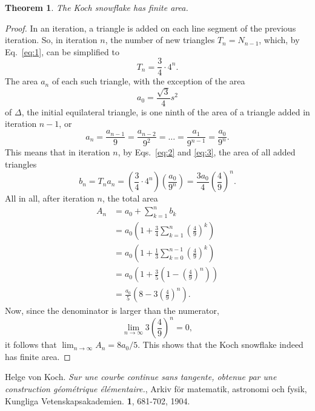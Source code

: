 \documentclass[12pt,a4paper]{article}
\newtheorem{theorem}{Theorem}
\begin{document}
\begin{theorem}
	The Koch snowflake has finite area.
\end{theorem}
\begin{proof}  
  In an iteration, a triangle is added on each line segment of the previous iteration. So, in iteration $n$, the number of new triangles $T_n = N_{n-1}$, which, by Eq.~\ref{eq:1}, can be simplified to 
	\begin{equation}
		\label{eq:2}
		T_n = \frac{3}{4} \cdot 4^n.
	\end{equation}
	The area $a_n$ of each such triangle, with the exception of the area
	\begin{displaymath}
		a_0 = \frac{\sqrt{3}}{4}s^2
	\end{displaymath}
	of $\Delta$, the initial equilateral triangle, is one ninth of the area of a triangle added in iteration $n - 1$, or 
	\begin{equation}
    	\label{eq:3}
    	a_n = \frac{a_{n-1}}{9} = \frac{a_{n-2}}{9^2} =  \ldots = \frac{a_1}{9^{n-1}} = \frac{a_0}{9^n}.
    \end{equation}
    This means that in iteration $n$, by Eqs.~\ref{eq:2} and \ref{eq:3}, the area of all added triangles
    \begin{displaymath}
    	b_n = T_na_n = \left(\frac{3}{4} \cdot 4^n \right) \left(\frac{a_0}{9^n}\right)  = \frac{3a_0}{4} \left(\frac{4}{9}\right)^n.
    \end{displaymath}
    All in all, after iteration $n$, the total area
    \begin{align*}
    	A_n &= a_0 + \sum_{k=1}^nb_k \\
    	&= a_0\left(1 + \frac{3}{4}\sum_{k=1}^n\left(\frac{4}{9}\right)^k\right) \\
    	&= a_0\left(1 + \frac{1}{3}\sum_{k=0}^{n-1}\left(\frac{4}{9}\right)^k\right) \\
    	&= a_0\left(1 + \frac{3}{5}\left(1 - \left(\frac{4}{9}\right)^n\right)\right) \\
    	&= \frac{a_0}{5}\left(8 - 3\left(\frac{4}{9}\right)^n\right).
    \end{align*}
    Now, since the denominator is larger than the numerator,
    \begin{displaymath}
    	\lim_{n\to\infty} 3\left(\frac{4}{9}\right)^n = 0,
    \end{displaymath}
    it follows that $\lim_{n\to \infty} A_n = 8a_0/5$. This shows that the Koch snowflake indeed has finite area.  
\end{proof}


\begin{thebibliography}{99}
   Helge von Koch. \emph{Sur une courbe continue sans tangente, obtenue par une construction  géométrique  élémentaire.}, Arkiv för matematik, astronomi och fysik, Kungliga Vetenskapsakademien. \textbf{1}, 681-702, 1904.
\end{thebibliography}
\end{document}
